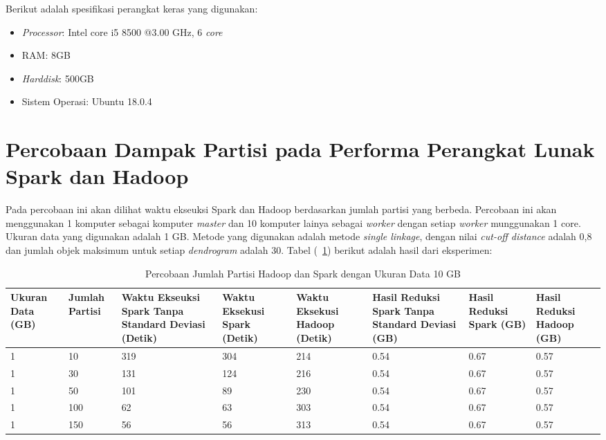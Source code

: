 Berikut adalah spesifikasi perangkat keras yang digunakan:

\begin{itemize}

\item \textit{Processor}: Intel core i5 8500 @3.00 GHz, 6 \textit{core}

\item RAM: 8GB

\item \textit{Harddisk}: 500GB

\item Sistem Operasi: Ubuntu 18.0.4

\end{itemize}






\section{Percobaan Dampak Partisi pada Performa Perangkat Lunak Spark dan Hadoop} 

Pada percobaan ini akan dilihat waktu ekseuksi Spark dan Hadoop berdasarkan jumlah partisi yang berbeda. Percobaan ini akan menggunakan 1 komputer sebagai komputer \textit{master} dan 10 komputer lainya sebagai \textit{worker} dengan setiap \textit{worker} munggunakan 1 core. Ukuran data yang digunakan adalah 1 GB. Metode yang digunakan adalah metode \textit{single linkage}, dengan nilai \textit{cut-off distance} adalah 0,8 dan jumlah objek maksimum untuk setiap \textit{dendrogram} adalah 30. Tabel (~\ref{tab:spark1}) berikut adalah hasil dari eksperimen:

\begin{table}[H] 
	\centering 
	\caption{Percobaan Jumlah Partisi Hadoop dan Spark dengan Ukuran Data 10 GB}
	\label{tab:spark1}
	\begin{tabular}{|p{1.1cm}|p{1.1cm}|p{2.5cm}|p{2.5cm}|p{2.5cm}|p{2cm}|p{1.5cm}|p{1.5cm}|}
\hline
Ukuran Data (GB) & Jumlah Partisi &  Waktu Ekseuksi Spark Tanpa Standard Deviasi (Detik) & Waktu Eksekusi Spark (Detik) & Waktu Eksekusi Hadoop (Detik) & Hasil Reduksi Spark Tanpa Standard Deviasi (GB) & Hasil Reduksi Spark (GB)  & Hasil Reduksi Hadoop (GB)\\ 
\hline
1 & 10 & 319 & 304 & 214 & 0.54 & 0.67 & 0.57 \\
\hline
1 & 30 & 131 & 124 & 216 & 0.54 & 0.67 & 0.57 \\
\hline
1 & 50 & 101 & 89 & 230 & 0.54 & 0.67 & 0.57 \\
\hline
1 & 100 & 62 & 63 & 303 & 0.54 & 0.67 & 0.57 \\
\hline
1 & 150 & 56 & 56 & 313 & 0.54 & 0.67 & 0.57 \\
\hline

\hline

	\end{tabular} 
\end{table}




